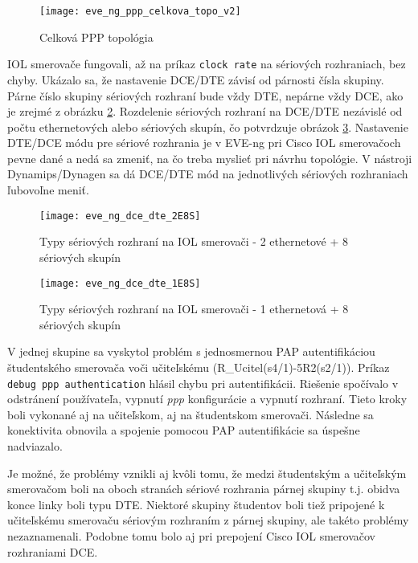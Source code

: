 \begin{figure}
    \centering
    \texttt{[image: eve\_ng\_ppp\_celkova\_topo\_v2]}
    \caption{Celková PPP topológia}
    \label{obr:eve_ng_ppp_celkova_topo_v2}
\end{figure}

IOL smerovače fungovali, až na príkaz \texttt{clock rate} na sériových rozhraniach, bez chyby. Ukázalo sa, že nastavenie DCE/DTE závisí od párnosti čísla skupiny. Párne číslo skupiny sériových rozhraní bude vždy DTE, nepárne vždy DCE, ako je zrejmé z obrázku \ref{obr:eve_ng_dce_dte_2E8S}. Rozdelenie sériových rozhraní na DCE/DTE nezávislé od počtu ethernetových alebo sériových skupín, čo potvrdzuje obrázok \ref{obr:eve_ng_dce_dte_1E8S}. Nastavenie DTE/DCE módu pre sériové rozhrania je v EVE-ng pri Cisco IOL smerovačoch pevne dané a nedá sa zmeniť, na čo treba myslieť pri návrhu topológie. V nástroji Dynamips/Dynagen sa dá DCE/DTE mód na jednotlivých sériových rozhraniach ľubovoľne meniť.

\begin{figure}
    \centering
    \texttt{[image: eve\_ng\_dce\_dte\_2E8S]}
    \caption{Typy sériových rozhraní na IOL smerovači - 2 ethernetové + 8 sériových skupín}
    \label{obr:eve_ng_dce_dte_2E8S}
\end{figure}

\begin{figure}
    \centering
    \texttt{[image: eve\_ng\_dce\_dte\_1E8S]}
    \caption{Typy sériových rozhraní na IOL smerovači - 1 ethernetová + 8 sériových skupín}
    \label{obr:eve_ng_dce_dte_1E8S}
\end{figure}

V jednej skupine sa vyskytol problém s jednosmernou PAP autentifikáciou študentského smerovača voči učiteľskému (R\_Ucitel(s4/1)-5R2(s2/1)). Príkaz \texttt{debug ppp authentication} hlásil chybu pri autentifikácii. Riešenie spočívalo v odstránení používateľa, vypnutí \emph{ppp} konfigurácie a vypnutí rozhraní. Tieto kroky boli vykonané aj na učiteľskom, aj na študentskom smerovači. Následne sa konektivita obnovila a spojenie pomocou PAP autentifikácie sa úspešne nadviazalo.

Je možné, že problémy vznikli aj kvôli tomu, že medzi študentským a učiteľským smerovačom boli na oboch stranách sériové rozhrania párnej skupiny t.j. obidva konce linky boli typu DTE. Niektoré skupiny študentov boli tiež pripojené k učiteľskému smerovaču sériovým rozhraním z párnej skupiny, ale takéto problémy nezaznamenali. Podobne tomu bolo aj pri prepojení Cisco IOL smerovačov rozhraniami DCE.

